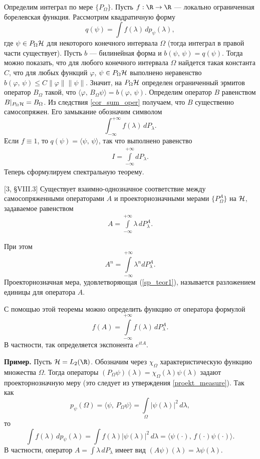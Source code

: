 \documentclass[a4paper
]{article}
\begin{document}
Определим интеграл по мере $\{P_\Omega\}$. Пусть $f:\R\rightarrow \R$
--- локально ограниченная борелевская функция. Рассмотрим
квадратичную форму $$q(\psi)=\int f(\lambda)\, dp_\psi(\lambda),$$
где $\psi\in P_{\Omega}{\cal H}$ для некоторого конечного интервала
$\Omega$ (тогда интеграл в правой части существует). Пусть $b$ ---
билинейная форма и $b(\psi, \, \psi)=q(\psi)$. Тогда можно показать, что
для любого конечного интервала $\Omega$ найдется такая константа $C$,
что для любых функций $\varphi$, $\psi\in P_{\Omega}{\cal H}$ выполнено
неравенство $b(\varphi, \, \psi)\le C\|\varphi\|\|\psi\|$. Значит,
на $P_{\Omega}{\cal H}$ определен ограниченный эрмитов оператор
$B_\Omega$ такой, что $\langle \varphi, \, B_\Omega\psi\rangle=b(\varphi, \, \psi)$.
Определим оператор $B$ равенством $B|_{P_\Omega
{\cal H}}=B_\Omega$. Из следствия \ref{cor_sum_oper} получаем, что
$B$ существенно самосопряжен. Его замыкание обозначим символом
$$\int _{-\infty}^{+\infty}f(\lambda)\, dP_\lambda.$$
Если $f\equiv 1$, то $q(\psi)=\langle \psi, \, \psi\rangle$, так что
выполнено равенство
\begin{align}
\label{razl_edinitsy}
I=\int \limits _{-\infty}^{+\infty}dP_\lambda.
\end{align}
Теперь сформулируем спектральную теорему.
\begin{Trm} {\rm [3, \S VIII.3]}
Существует взаимно-однозначное соответствие между самосопряженными
операторами $A$ и проекторнозначными мерами $\{P_\Omega^A\}$ на
${\cal H}$, задаваемое равенством
\begin{align}
\label{sp_teor1}
A=\int \limits _{-\infty}^{+\infty}\lambda \, dP^A_\lambda.
\end{align}
\end{Trm}
При этом $$A^n=\int \limits _{-\infty}^{+\infty}\lambda^n dP^A_\lambda.$$
Проекторнозначная мера, удовлетворяющая (\ref{sp_teor1}), называется
разложением единицы для оператора $A$. \par
С помощью этой теоремы можно определить функцию от оператора формулой
$$f(A)=\int \limits _{-\infty}^{+\infty}f(\lambda)\, dP^A_\lambda.$$
В частности, так определяется экспонента $e^{itA}$. \par
{\bf Пример.} Пусть ${\cal H}=L_2(\R)$. Обозначим через $\chi_\Omega$
характеристическую функцию множества $\Omega$. Тогда операторы
$(P_\Omega\psi)(\lambda)=\chi_\Omega(\lambda)\psi(\lambda)$ задают
проекторнозначную меру (это следует из утверждения \ref{proekt_measure}).
Так как $$p_\psi(\Omega)=\langle \psi, \, P_\Omega\psi\rangle =\int \limits _\Omega
|\psi(\lambda)| ^2\, d\lambda,$$ то $$\int f(\lambda)\, dp_\psi(\lambda)=\int f(\lambda)
|\psi(\lambda)| ^2\, d\lambda=\langle \psi(\cdot), \, f(\cdot)\psi(\cdot)\rangle.$$
В частности, оператор $A=\int \lambda\, dP_\lambda$ имеет вид $(A\psi)
(\lambda)=\lambda\psi(\lambda)$.
\end{document}
